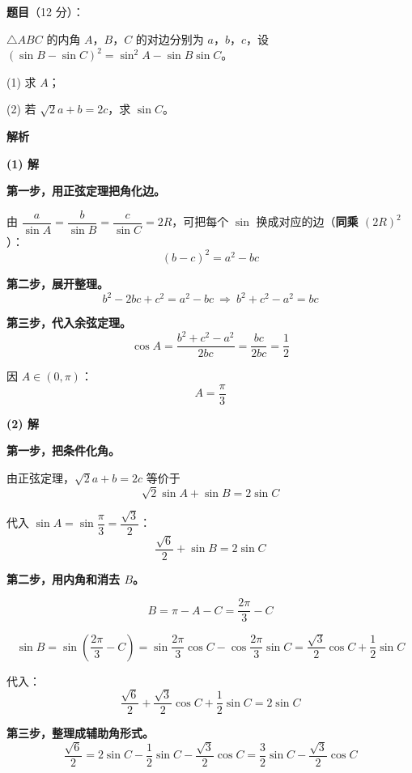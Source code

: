 \begin{answer}

\textbf{题目}（12 分）：

$\triangle ABC$ 的内角 $A$，$B$，$C$ 的对边分别为 $a$，$b$，$c$，设 $(\sin B-\sin C)^{2}=\sin^{2}A-\sin B\sin C$。

  (1) 求 $A$；

  (2) 若 $\sqrt2a+b=2c$，求 $\sin C$。

\textbf{解析}

\par\medskip

\textbf{(1) 解}

\textbf{第一步，用正弦定理把角化边。}

由 $\dfrac a{\sin A}=\dfrac b{\sin B}=\dfrac c{\sin C}=2R$，可把每个 $\sin$ 换成对应的边（\textbf{同乘 $(2R)^{2}$}）：
\nopagebreak[4]
\[(b-c)^{2}=a^{2}-bc\]

\textbf{第二步，展开整理。}
\nopagebreak[4]
\[b^{2}-2bc+c^{2}=a^{2}-bc\ \Longrightarrow\ b^{2}+c^{2}-a^{2}=bc\]

\textbf{第三步，代入余弦定理。}
\nopagebreak[4]
\[\cos A=\frac{b^{2}+c^{2}-a^{2}}{2bc}=\frac{bc}{2bc}=\frac12\]

因 $A\in(0,\pi)$：
\nopagebreak[4]
\[A=\frac\pi3\]

\par\medskip

\textbf{(2) 解}

\textbf{第一步，把条件化角。}

由正弦定理，$\sqrt2a+b=2c$ 等价于
\nopagebreak[4]
\[\sqrt2\sin A+\sin B=2\sin C\]

代入 $\sin A=\sin\dfrac\pi3=\dfrac{\sqrt3}2$：
\nopagebreak[4]
\[\frac{\sqrt6}2+\sin B=2\sin C\]

\textbf{第二步，用内角和消去 $B$。}

\nopagebreak[4]
\[B=\pi-A-C=\frac{2\pi}3-C\]

\nopagebreak[4]
\[\sin B=\sin\left(\frac{2\pi}3-C\right)=\sin\frac{2\pi}3\cos C-\cos\frac{2\pi}3\sin C=\frac{\sqrt3}2\cos C+\frac12\sin C\]

代入：
\nopagebreak[4]
\[\frac{\sqrt6}2+\frac{\sqrt3}2\cos C+\frac12\sin C=2\sin C\]

\textbf{第三步，整理成辅助角形式。}
\nopagebreak[4]
\[\frac{\sqrt6}2=2\sin C-\frac12\sin C-\frac{\sqrt3}2\cos C=\frac32\sin C-\frac{\sqrt3}2\cos C\]


\end{answer}
